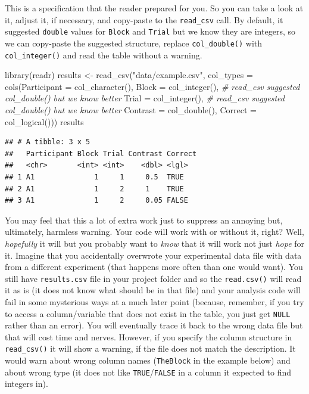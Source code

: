 \documentclass[
]{book}
\newenvironment{Shaded}{\begin{snugshade}}{\end{snugshade}}
\newcommand{\AttributeTok}[1]{\textcolor[rgb]{0.77,0.63,0.00}{#1}}
\newcommand{\CommentTok}[1]{\textcolor[rgb]{0.56,0.35,0.01}{\textit{#1}}}
\newcommand{\FunctionTok}[1]{\textcolor[rgb]{0.00,0.00,0.00}{#1}}
\newcommand{\NormalTok}[1]{#1}
\newcommand{\OtherTok}[1]{\textcolor[rgb]{0.56,0.35,0.01}{#1}}
\newcommand{\StringTok}[1]{\textcolor[rgb]{0.31,0.60,0.02}{#1}}
\begin{document}
This is a specification that the reader prepared for you. So you can take a look at it, adjust it, if necessary, and copy-paste to the \texttt{read\_csv} call. By default, it suggested \texttt{double} values for \texttt{Block} and \texttt{Trial} but we know they are integers, so we can copy-paste the suggested structure, replace \texttt{col\_double()} with \texttt{col\_integer()} and read the table without a warning.

\begin{Shaded}
\begin{Highlighting}[]
\FunctionTok{library}\NormalTok{(readr)}
\NormalTok{results }\OtherTok{\textless{}{-}} \FunctionTok{read\_csv}\NormalTok{(}\StringTok{"data/example.csv"}\NormalTok{, }
                    \AttributeTok{col\_types =} \FunctionTok{cols}\NormalTok{(}\AttributeTok{Participant =} \FunctionTok{col\_character}\NormalTok{(),}
                                     \AttributeTok{Block =} \FunctionTok{col\_integer}\NormalTok{(), }\CommentTok{\# read\_csv suggested col\_double() but we know better}
                                     \AttributeTok{Trial =} \FunctionTok{col\_integer}\NormalTok{(), }\CommentTok{\# read\_csv suggested col\_double() but we know better}
                                     \AttributeTok{Contrast =} \FunctionTok{col\_double}\NormalTok{(),}
                                     \AttributeTok{Correct =} \FunctionTok{col\_logical}\NormalTok{()))}
\NormalTok{results}
\end{Highlighting}
\end{Shaded}

\begin{verbatim}
## # A tibble: 3 x 5
##   Participant Block Trial Contrast Correct
##   <chr>       <int> <int>    <dbl> <lgl>  
## 1 A1              1     1     0.5  TRUE   
## 2 A1              1     2     1    TRUE   
## 3 A1              1     2     0.05 FALSE
\end{verbatim}

You may feel that this a lot of extra work just to suppress an annoying but, ultimately, harmless warning. Your code will work with or without it, right? Well, \emph{hopefully} it will but you probably want to \emph{know} that it will work not just \emph{hope} for it. Imagine that you accidentally overwrote your experimental data file with data from a different experiment (that happens more often than one would want). You still have \texttt{results.csv} file in your project folder and so the \texttt{read.csv()} will read it as is (it does not know what should be in that file) and your analysis code will fail in some mysterious ways at a much later point (because, remember, if you try to access a column/variable that does not exist in the table, you just get \texttt{NULL} rather than an error). You will eventually trace it back to the wrong data file but that will cost time and nerves. However, if you specify the column structure in \texttt{read\_csv()} it will show a warning, if the file does not match the description. It would warn about wrong column names (\texttt{TheBlock} in the example below) and about wrong type (it does not like \texttt{TRUE}/\texttt{FALSE} in a column it expected to find integers in).
\end{document}
